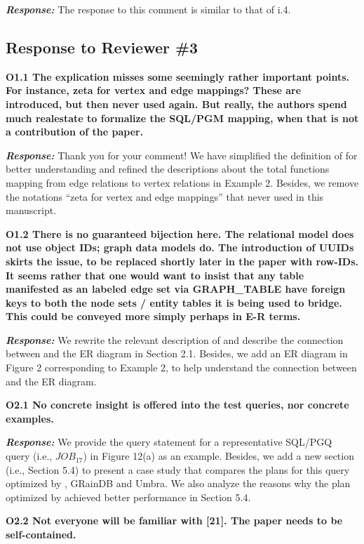 \textbf{\textit{Response: }}
The response to this comment is similar to that of i.4.


\subsection{Response to Reviewer \#3}

\textbf{
O1.1 The explication misses some seemingly rather important points.
For instance, zeta for vertex and edge mappings? These are introduced, but then never used again. But really, the authors spend much realestate to formalize the SQL/PGM mapping, when that is not a contribution of the paper.}

\textbf{\textit{Response: }}
Thank you for your comment! We have simplified the definition of \rgmapping for better understanding and refined the descriptions about the total functions mapping from edge relations to vertex relations in Example 2.
Besides, we remove the notations ``zeta for vertex and edge mappings'' that never used in this manuscript.


\textbf{
O1.2 There is no guaranteed bijection here. The relational model does not use object IDs; graph data models do. The introduction of UUIDs skirts the issue, to be replaced shortly later in the paper with row-IDs. It seems rather that one would want to insist that any table manifested as an labeled edge set via GRAPH\_TABLE have foreign keys to both the node sets / entity tables it is being used to bridge. This could be conveyed more simply perhaps in E-R terms.}

\textbf{\textit{Response: }}
We rewrite the relevant description of \rgmapping and describe the connection between \rgmapping and the ER diagram in Section 2.1.
Besides, we add an ER diagram in Figure 2 corresponding to Example 2, to help understand the connection between \rgmapping and the ER diagram.


\textbf{O2.1 No concrete insight is offered into the test queries, nor concrete examples. }

\textbf{\textit{Response: }}
We provide the query statement for a representative SQL/PGQ query (i.e., $JOB_{17}$) in Figure 12(a) as an example.
Besides, we add a new section (i.e., Section 5.4) to present a case study that compares the plans for this query optimized by \name, GRainDB and Umbra.
We also analyze the reasons why the plan optimized by \name achieved better performance in Section 5.4.


\textbf{
O2.2 Not everyone will be familiar with [21]. The paper needs to be self-contained. }

